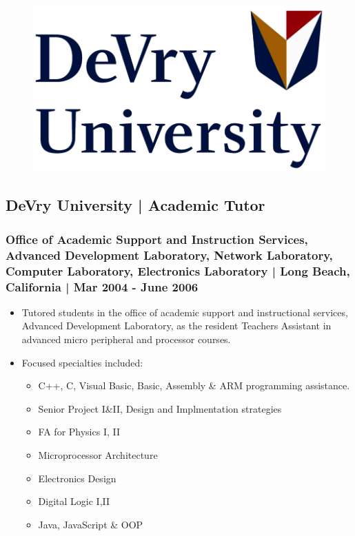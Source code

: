 \documentclass[letter,10pt]{article}
\begin{document}
\begin{figure}
\includegraphics[width=0.8\linewidth]{./img/50p_cr_devry.jpg}
\end{figure}

\subsection*{DeVry University | Academic Tutor}
\label{sec:orgfd0efd2}
\subsubsection*{Office of Academic Support and Instruction Services, Advanced Development Laboratory, Network Laboratory, Computer Laboratory, Electronics Laboratory | Long Beach, California | Mar 2004 - June 2006}
\label{sec:org104d60d}
\begin{itemize}
\item Tutored students in the office of academic support and instructional services, Advanced Development Laboratory, as the resident Teachers Assistant in advanced micro peripheral and processor courses.
\item Focused specialties included:
\begin{itemize}
\item C++, C, Visual Basic, Basic, Assembly \& ARM programming assistance.
\item Senior Project I\&II, Design and Implmentation strategies
\item FA for Physics I, II
\item Microprocessor Architecture
\item Electronics Design
\item Digital Logic I,II
\item Java, JavaScript \& OOP
\end{itemize}
\end{itemize}
\end{document}
